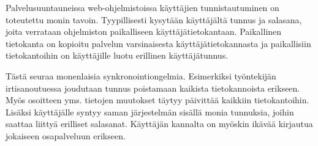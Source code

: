 Palvelusuuntauneissa web-ohjelmistoissa käyttäjien tunnistautuminen on toteutettu monin tavoin. Tyypillisesti kysytään käyttäjältä tunnus ja salasana, joita verrataan ohjelmiston paikalliseen käyttäjätietokantaan. Paikallinen tietokanta on kopioitu palvelun varsinaisesta käyttäjätietokannasta ja paikallisiin tietokantoihin on käyttäjille luotu erillinen käyttäjätunnus.

Tästä seuraa monenlaisia synkronointiongelmia. Esimerkiksi työntekijän irtisanoutuessa joudutaan tunnus poistamaan kaikista tietokannoista erikseen. Myös osoitteen yms. tietojen muutokset täytyy päivittää kaikkiin tietokantoihin. Lisäksi käyttäjälle syntyy saman järjestelmän sisällä monia tunnuksia, joihin saattaa liittyä erilliset salasanat. Käyttäjän kannalta on myöskin ikävää kirjautua jokaiseen osapalveluun erikseen.